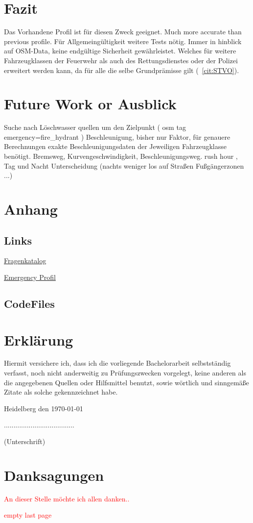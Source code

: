 \documentclass[12pt,a4paper]{article}
\newcommand\todo[1]{\textcolor{red}{#1}}
\begin{document}
\newpage
\section{Fazit}

Das Vorhandene Profil ist für diesen Zweck geeignet.
Much more accurate than previous profile. 
Für Allgemeingültigkeit weitere Tests nötig. Immer in hinblick auf OSM-Data, keine endgültige Sicherheit gewährleistet.
Welches für weitere Fahrzeugklassen der Feuerwehr als auch des Rettungsdienstes oder der Polizei erweitert werden kann, da für alle die selbe Grundprämisse gilt (~\ref{cit:STVO}).

\newpage
\section{Future Work or Ausblick}

Suche nach Löschwasser quellen um den Zielpunkt ( osm tag emergency=fire\_hydrant )
Beschleunigung, bisher nur Faktor, für genauere Berechnungen exakte Beschleunigungsdaten der Jeweiligen Fahrzeugklasse benötigt. Bremsweg, Kurvengeschwindigkeit, Beschleunigungsweg.
rush hour , Tag und Nacht Unterscheidung (nachts weniger los auf Straßen\/ Fußgängerzonen ...)

\newpage
\printbibliography

\newpage
\section{Anhang}
\label{sec:anhang}

\subsection*{Links}

\href{https://docs.google.com/document/d/1nwjmea0jwauJWezk_2TMQs5CbAHv7he2NI4kxqMu2w4/}{Fragenkatalog}\par
\smallskip
\href{http://emergency.openrouteservice.org/reach?n1=48.456787&n2=10.823207&n3=14&a=48.454054,10.824484&b=5b&i=0&j1=5&j2=1&f3=3&f1=7.5&f2=2.5&f5=7&d=80&k1=en-US&k2=km}{Emergency Profil}

\subsection*{CodeFiles}

\newpage
\section*{Erklärung}
\vspace{1cm}
Hiermit versichere ich, dass ich die vorliegende Bachelorarbeit selbstständig verfasst, noch nicht anderweitig zu Prüfungszwecken vorgelegt, keine anderen als die angegebenen Quellen oder Hilfsmittel benutzt, sowie wörtlich und sinngemäße Zitate als solche gekennzeichnet habe.\par
\bigskip

{\flushleft Heidelberg den \today } {\hfill .....................................\par}
{\hfill (Unterschrift)}

\newpage
\section*{Danksagungen}
\todo{An dieser Stelle möchte ich allen danken.. }

\newpage
\todo{empty last page}
\end{document}
